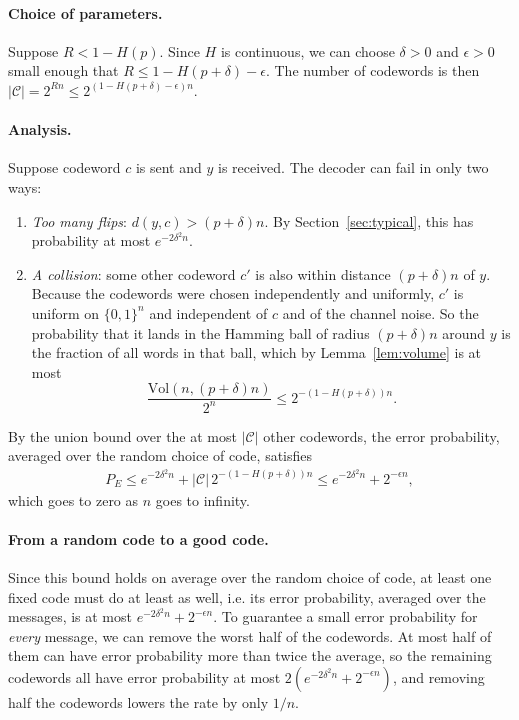 \paragraph{Choice of parameters.} Suppose \(R < 1 - H(p)\). Since \(H\) is continuous, we can choose \(\delta > 0\) and \(\epsilon > 0\) small enough that \(R \leq 1 - H(p+\delta) - \epsilon\). The number of codewords is then \(|\mathcal{C}| = 2^{Rn} \leq 2^{(1-H(p+\delta)-\epsilon)n}\).

\paragraph{Analysis.} Suppose codeword \(c\) is sent and \(y\) is received. The decoder can fail in only two ways:
\begin{enumerate}
    \item \emph{Too many flips}: \(d(y, c) > (p+\delta)n\). By Section~\ref{sec:typical}, this has probability at most \(e^{-2\delta^2 n}\).
    \item \emph{A collision}: some other codeword \(c'\) is also within distance \((p+\delta)n\) of \(y\). Because the codewords were chosen independently and uniformly, \(c'\) is uniform on \(\{0,1\}^n\) and independent of \(c\) and of the channel noise. So the probability that it lands in the Hamming ball of radius \((p+\delta)n\) around \(y\) is the fraction of all words in that ball, which by Lemma~\ref{lem:volume} is at most
    \[\frac{\mathrm{Vol}(n, (p+\delta)n)}{2^n} \leq 2^{-(1-H(p+\delta))n}.\]
\end{enumerate}
By the union bound over the at most \(|\mathcal{C}|\) other codewords, the error probability, averaged over the random choice of code, satisfies
\begin{align*}
    P_{E} \leq e^{-2\delta^2 n} + |\mathcal{C}|\, 2^{-(1-H(p+\delta))n} \leq e^{-2\delta^2 n} + 2^{-\epsilon n},
\end{align*}
which goes to zero as \(n\) goes to infinity.

\paragraph{From a random code to a good code.} Since this bound holds on average over the random choice of code, at least one fixed code must do at least as well, i.e. its error probability, averaged over the messages, is at most \(e^{-2\delta^2 n} + 2^{-\epsilon n}\). To guarantee a small error probability for \emph{every} message, we can remove the worst half of the codewords. At most half of them can have error probability more than twice the average, so the remaining codewords all have error probability at most \(2(e^{-2\delta^2 n} + 2^{-\epsilon n})\), and removing half the codewords lowers the rate by only \(1/n\).

